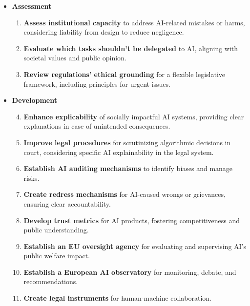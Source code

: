 \begin{itemize}
    \item \textbf{Assessment}
    \begin{enumerate}[label*=\arabic*.]
        \item \textbf{Assess institutional capacity} to address AI-related mistakes or harms, considering liability from design to reduce negligence.
        \item \textbf{Evaluate which tasks shouldn't be delegated} to AI, aligning with societal values and public opinion.
        \item \textbf{Review regulations' ethical grounding} for a flexible legislative framework, including principles for urgent issues.
    \end{enumerate}

    \item \textbf{Development}
    \begin{enumerate}[label*=\arabic*.]
        \setcounter{enumi}{3}
        \item \textbf{Enhance explicability} of socially impactful AI systems, providing clear explanations in case of unintended consequences.
        \item \textbf{Improve legal procedures} for scrutinizing algorithmic decisions in court, considering specific AI explainability in the legal system.
        \item \textbf{Establish AI auditing mechanisms} to identify biases and manage risks.
        \item \textbf{Create redress mechanisms} for AI-caused wrongs or grievances, ensuring clear accountability.
        \item \textbf{Develop trust metrics} for AI products, fostering competitiveness and public understanding.
        \item \textbf{Establish an EU oversight agency} for evaluating and supervising AI's public welfare impact.
        \item \textbf{Establish a European AI observatory} for monitoring, debate, and recommendations.
        \item \textbf{Create legal instruments} for human-machine collaboration.
    \end{enumerate}


\end{itemize}
